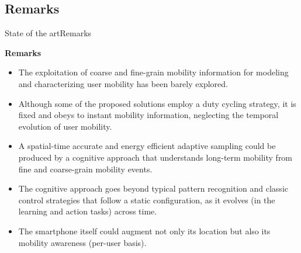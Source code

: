 \subsection{Remarks}
\begin{frame}{State of the art}{Remarks}
\small
\begin{block}{\small \textbf{Remarks}}
\begin{itemize}
  \item The exploitation of coarse and fine-grain mobility information for modeling and characterizing user mobility has been barely explored.
  \item Although some of the proposed solutions employ a duty cycling strategy, it is fixed and obeys to instant mobility information, neglecting the temporal evolution of user mobility.
  \item A spatial-time accurate and energy efficient adaptive sampling could be produced by a cognitive approach that understands long-term mobility from fine and coarse-grain mobility events.
  \item The cognitive approach goes beyond typical pattern recognition and classic control strategies that follow a static configuration, as it evolves (in the learning and action tasks) across time.
  \item The smartphone itself could augment not only its location but also its mobility awareness (per-user basis).
\end{itemize}
\end{block}
\end{frame}